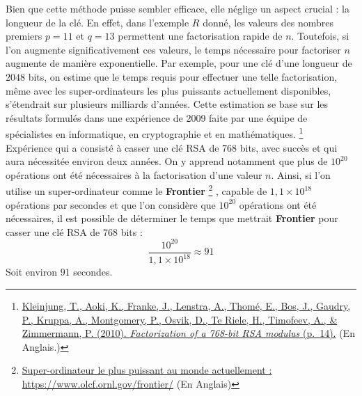 \documentclass{article}
\begin{document}
Bien que cette méthode puisse sembler efficace, elle néglige un aspect
crucial : la longueur de la clé. En effet, dans l'exemple \(R\) donné,
les valeurs des nombres premiers \(p = 11\) et \(q = 13\) permettent une
factorisation rapide de \(n\). Toutefois, si l'on augmente
significativement ces valeurs, le temps nécessaire pour factoriser \(n\)
augmente de manière exponentielle. Par exemple, pour une clé d'une
longueur de \(2048\) bits, on estime que le temps requis pour effectuer
une telle factorisation, même avec les super-ordinateurs les plus
puissants actuellement disponibles, s'étendrait sur plusieurs milliards
d'années. Cette estimation se base sur les résultats formulés dans une
expérience de 2009 faite par une équipe de spécialistes en informatique,
en cryptographie et en mathématiques.
\footnote{\href{https://eprint.iacr.org/2010/006.pdf}{Kleinjung,
		T., Aoki, K., Franke, J., Lenstra, A., Thomé, E., Bos, J., Gaudry, P.,
		Kruppa, A., Montgomery, P., Osvik, D., Te Riele, H., Timofeev, A., \&
		Zimmermann, P. (2010). \textit{Factorization of a 768-bit RSA modulus}
		(p.~14).} (En Anglais.)} \\

Expérience qui a consisté à casser une clé
RSA de \(768\) bits, avec succès et qui aura nécessitée environ deux
années. On y apprend notamment que plus de \(10^{20}\) opérations ont
été nécessaires à la factorisation d'une valeur \(n\). Ainsi, si l'on
utilise un super-ordinateur comme le \textbf{Frontier}
\footnote{\href{https://www.olcf.ornl.gov/frontier/}{Super-ordinateur le plus puissant au monde actuellement : https://www.olcf.ornl.gov/frontier/} (En Anglais)}
, capable de \(1,1 \times 10^{18}\) opérations par
secondes et que l'on considère que \(10^{20}\) opérations ont été
nécessaires, il est possible de déterminer le temps que mettrait
\textbf{Frontier} pour casser une clé RSA de \(768\) bits :
\[ \frac{10^{20}}{1,1 \times 10^{18}} \approx 91 \]Soit environ \(91\)
secondes. \clearpage
\end{document}
